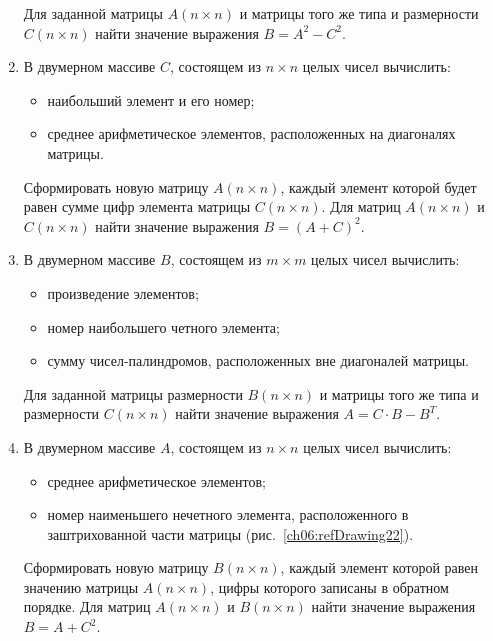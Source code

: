 \begin{enumerate}
Для заданной матрицы $A(n\times n)$ и матрицы того же типа и размерности
$C(n\times n)$ найти значение выражения  $B=A^2-C^2$.



\item В двумерном массиве $C$, состоящем из $n\times n$ целых чисел вычислить:

\begin{itemize}
\item наибольший элемент и его номер;
\item среднее арифметическое элементов, расположенных на диагоналях матрицы.
\end{itemize}

Сформировать новую матрицу $A(n\times n)$, каждый элемент которой будет равен сумме цифр
элемента матрицы $C(n\times n)$. Для матриц $A(n\times n)$ и
$C(n\times n)$ найти значение выражения  $B=(A+C)^2$.
\item В двумерном массиве $B$, состоящем из $m\times m$ целых чисел вычислить: 
\begin{itemize}
\item произведение элементов;
\item номер наибольшего четного элемента;
\item сумму чисел-палиндромов, расположенных вне диагоналей матрицы.
\end{itemize}

Для заданной матрицы размерности $B(n\times n)$ и матрицы того же типа и
размерности $C(n\times n)$ найти значение выражения   $A=C\cdot B-B^T$.
\item В двумерном массиве $A$, состоящем из $n\times n$ целых чисел вычислить:

\begin{itemize}
\item среднее арифметическое элементов;
\item номер наименьшего нечетного элемента, расположенного в заштрихованной части матрицы (рис.~\ref{ch06:refDrawing22}).
\end{itemize}

Сформировать новую матрицу $B(n\times n)$, каждый элемент которой равен значению матрицы
$A(n\times n)$, цифры которого записаны в обратном порядке. Для матриц
$A(n\times n)$ и $B(n\times n)$ найти значение выражения  $B=A+C^2$.




\end{enumerate}
